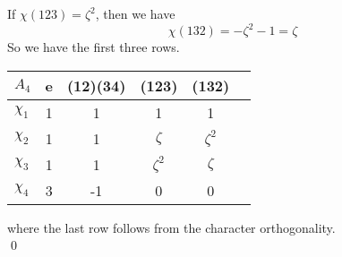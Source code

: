 \documentclass[12pt]{amsart}
\begin{document}
If $\chi(123)=\zeta^2$, then we have 
\[\chi(132)=-\zeta^2-1=\zeta\]
So we have the first three rows.
\begin{table}[H]
    \centering
    \begin{tabular}{l|ccccl}
        $A_4$    & e & (12)(34) & (123) & (132)  \\ \hline
        $\chi_1$ & 1 & 1  & 1       & 1            \\
        $\chi_2$ & 1 & 1  & $\zeta$ & $\zeta^2$         \\
        $\chi_3$ & 1 & 1  & $\zeta^2$ & $\zeta$          \\
        $\chi_4$ & 3 & -1 & 0 &0           
    \end{tabular}
\end{table}
where the last row follows from the character orthogonality.
\\\qed
\end{document}
